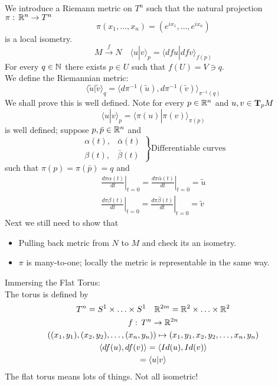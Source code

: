 We introduce a Riemann metric on $T^n$ such that the natural projection $\pi:\, \mathbb{R}^n \to T^n$
$$\pi(x_1,\ldots, x_n) = (e^{ix_1},\ldots, e^{ix_n})$$
is a local isometry.
$$M \xrightarrow{f} N\quad \langle u | v \rangle _p = \langle dfu | dfv \rangle _{f(p)}$$
For every $q\in \mathbb{N}$ there exists $p\in U$ such that $f(U)= V\ni q$.\\
We define the Riemannian metric:
$$\langle \tilde u | \tilde v \rangle_q= \langle d\pi^{-1}(\tilde u), d\pi^{-1}(\tilde v) \rangle_{\pi^{-1}(q)}$$
We shall prove this is well defined. Note for every $p\in \mathbb{R}^n$ and $u,v\in \text{\textbf{T}}_pM$
$$\langle u| v\rangle_p = \langle \pi(u) | \pi(v) \rangle_{\pi(p)}$$
is well defined; suppose $p,\bar p\in \mathbb{R}^n$ and
\[ \left.\begin{array}{cc} \alpha(t), & \bar \alpha(t) \\
\beta(t),& \bar \beta(t) \end{array}\right\}\text{Differentiable curves} \]
such that $\pi(p) = \pi(\bar p) = q $ and 
\begin{gather*}
\left.\frac{d\pi \alpha(t)}{dt}\right|_{t=0}=\left.\frac{d\pi \bar \alpha(t)}{dt}\right|_{t=0} = \tilde u \\
\left.\frac{d\pi \beta(t)}{dt}\right|_{t=0}=\left.\frac{d\pi\bar \beta(t)}{dt}\right|_{t=0}= \tilde v
\end{gather*} 
Next we still need to show that 
\begin{itemize}
\item Pulling back metric from $N$ to $M$ and check its an isometry.
\item $\pi$ is many-to-one; locally the metric is representable in the same way.\end{itemize}
Immersing the Flat Torus:\\
The torus is defined by
\begin{gather*}
T^n = S^1\times \ldots \times S^1 \quad \mathbb{R}^{2m} = \mathbb{R}^2\times \ldots \times \mathbb{R}^2\\
f:\, T^n \to \mathbb{R}^{2n}\\
\left( (x_1,y_1),(x_2,y_2),\ldots , (x_n,y_n)\right) \mapsto (x_1,y_1,x_2,y_2,\ldots, x_n,y_n)\\
\langle df(u), df(v) \rangle = \langle Id(u), Id(v) \rangle\\
= \langle u| v \rangle
\end{gather*}
The flat torus means lots of things. Not all isometric!

